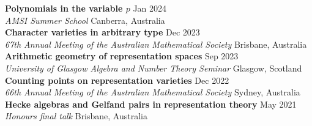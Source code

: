 \documentclass[8pt]{amsart}
\begin{document}
\textbf{Polynomials in the variable $p$} \hfill Jan 2024 \\
\emph{AMSI Summer School} \hfill Canberra, Australia \\
\textbf{Character varieties in arbitrary type} \hfill Dec 2023 \\
\emph{67th Annual Meeting of the Australian Mathematical Society} \hfill Brisbane, Australia \\
\textbf{Arithmetic geometry of representation spaces} \hfill Sep 2023 \\
\emph{University of Glasgow Algebra and Number Theory Seminar} \hfill Glasgow, Scotland \\
\textbf{Counting points on representation varieties} \hfill Dec 2022 \\
\emph{66th Annual Meeting of the Australian Mathematical Society} \hfill Sydney, Australia \\
\textbf{Hecke algebras and Gelfand pairs in representation theory} \hfill May 2021 \\
\emph{Honours final talk} \hfill Brisbane, Australia


\newpage
\end{document}
